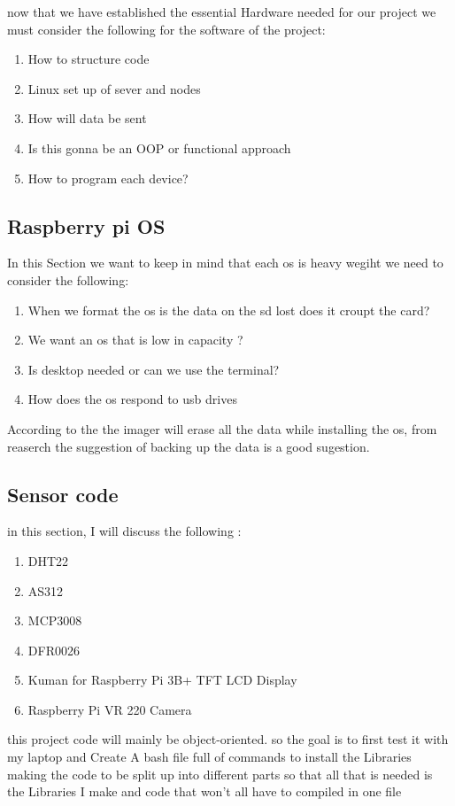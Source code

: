 
	now that we have established the  essential Hardware needed for our project we must consider the following  for the software of the  project:
	\begin{enumerate}
	    \item How to structure code 
	    \item Linux set up of sever and nodes
	    \item How will data be sent
	    \item Is this gonna be an OOP or functional  approach
	    \item How to program each device?
	\end{enumerate}
	\subsection{Raspberry pi OS}
	\label{pi os}
	In this Section  we want to keep in mind  that each os is  heavy wegiht  we need to consider the following:
	\begin{enumerate}
		\item When we  format the os is the  data on the sd lost does it croupt the  card?
		\item We want an os that is low in capacity ?
		\item Is desktop needed or can we  use  the  terminal?
		\item How does  the os  respond to usb drives
	\end{enumerate}
	 According to the \cite{projects} the imager will erase all the data while installing the os, from reaserch  the suggestion of backing up the data is  a  good sugestion.
	\subsection{Sensor code}
	in this section, I will discuss the following :
	\begin{enumerate}
		\item DHT22
		\item AS312
		\item MCP3008
		\item DFR0026
		\item Kuman for Raspberry Pi 3B+ TFT LCD Display
		\item Raspberry Pi VR 220 Camera 
	\end{enumerate}
	this project code will mainly be object-oriented. so the goal is to first test it with my laptop and  Create A bash file  full of  commands to install  the Libraries
	making the code to be split up  into  different parts so that all that is needed is the Libraries I make and code that won't all have to  compiled in one file

